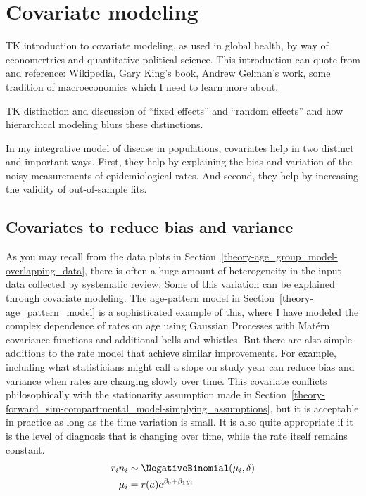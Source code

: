 \section{Covariate modeling}

TK introduction to covariate modeling, as used in global health, by
way of economertrics and quantitative political science.  This
introduction can quote from and reference: Wikipedia, Gary King's
book, Andrew Gelman's work, some tradition of macroeconomics which I
need to learn more about.

TK distinction and discussion of ``fixed effects'' and ``random
effects'' and how hierarchical modeling blurs these distinctions.

In my integrative model of disease in populations, covariates help
in two distinct and important ways.  First, they help by
explaining the bias and variation of the noisy measurements of
epidemiological rates.  And second, they help by increasing the
validity of out-of-sample fits.


\subsection{Covariates to reduce bias and variance}

As you may recall from the data plots in
Section~\ref{theory-age_group_model-overlapping_data}, there is often
a huge amount of heterogeneity in the input data collected by
systematic review.  Some of this variation can be explained through
covariate modeling.  The age-pattern model in
Section~\ref{theory-age_pattern_model} is a sophisticated example of
this, where I have modeled the complex dependence of rates on age
using Gaussian Processes with Mat\'{e}rn covariance functions and
additional bells  and whistles.  But there are also simple additions
to the rate model that achieve similar improvements.  For example,
including what statisticians might call a slope on study year can
reduce bias and variance when rates are changing slowly over time.
This covariate conflicts philosophically with the stationarity
assumption made in
Section~\ref{theory-forward_sim-compartmental_model-simplying_assumptions},
but it is acceptable in practice as long as the time variation is
small.  It is also quite appropriate if it is the level of diagnosis
that is changing over time, while the rate itself remains constant.
\begin{align*}
r_i n_i &\sim \NegativeBinomial(\mu_i, \delta)\\
\mu_i &= r(a)e^{\beta_0 + \beta_1 y_i}
\end{align*}

